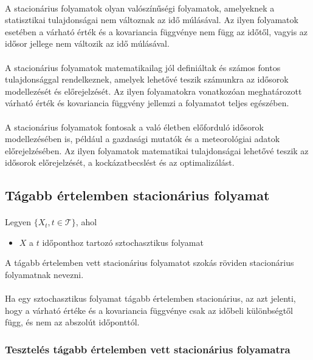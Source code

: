 \documentclass[11pt,a4pape,draftr]{article}
\begin{document}
			\paragraph{}
				A stacionárius folyamatok olyan valószínűségi folyamatok, amelyeknek a statisztikai tulajdonságai nem változnak az idő múlásával. Az ilyen folyamatok esetében a várható érték és a kovariancia függvénye nem függ az időtől, vagyis az idősor jellege nem változik az idő múlásával.
			\paragraph{}
				A stacionárius folyamatok matematikailag jól definiáltak és számos fontos tulajdonsággal rendelkeznek, amelyek lehetővé teszik számunkra az idősorok modellezését és előrejelzését. Az ilyen folyamatokra vonatkozóan meghatározott várható érték és kovariancia függvény jellemzi a folyamatot teljes egészében. 
			\paragraph{}
				A stacionárius folyamatok fontosak a való életben előforduló idősorok modellezésében is, például a gazdasági mutatók és a meteorológiai adatok előrejelzésében. Az ilyen folyamatok matematikai tulajdonságai lehetővé teszik az idősorok előrejelzését, a kockázatbecslést és az optimalizálást. 
			\subsection{Tágabb értelemben stacionárius folyamat}
				\paragraph{}
					Legyen $\{X_t, t \in \mathcal{T}\}$, ahol
					\begin{itemize}
						\item $X$ a $t$ időponthoz tartozó sztochasztikus folyamat
					\end{itemize}
					A tágabb értelemben vett stacionárius folyamatot szokás röviden stacionárius folyamatnak nevezni.
				\paragraph{}
					Ha egy sztochasztikus folyamat tágabb értelemben stacionárius, az azt jelenti, hogy a várható értéke és a kovariancia függvénye csak az időbeli különbségtől függ, és nem az abszolút időponttól.
				\subsubsection{Tesztelés tágabb értelemben vett stacionárius folyamatra}
\end{document}
